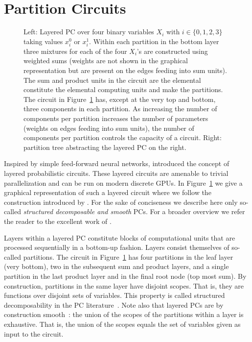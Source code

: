 \section{Partition Circuits}
\label{sec:pc}

\begin{figure}[t]

	\centering
	

	\caption{Left: Layered PC over four binary variables $X_i$ with $i \in \{0,1,2,3\}$ taking values $x_i^0$ or $x_i^1$.
		Within each partition in the bottom layer three mixtures for each of the four $X_i$'s are constructed using weighted sums (weights are not shown in the graphical representation but are present on the edges feeding into sum units).
		The sum and product units in the circuit are the elemental constitute the elemental computing units and make the partitions.
		The circuit in Figure~\ref{fig:circuit} has, except at the very top and bottom, three components in each partition.
		As increasing the number of components per partition increases the number of parameters (weights on edges feeding into sum units), the number of components per partition controls the capacity of a circuit.
		Right: partition tree abstracting the layered PC on the right.}
	\label{fig:circuit}
\end{figure}







Inspired by simple feed-forward neural networks, \citet{peharz2019random,peharz2020einsum} introduced the concept of layered probabilistic circuits.
These layered circuits are amenable to trivial parallelization and can be run on modern discrete GPUs. In Figure~\ref{fig:circuit} we give a graphical representation of such a layered circuit where we follow the construction introduced by \citet{shih2021hyperspns}. For the sake of conciseness we describe here only so-called \textit{structured decomposable and smooth} PCs. For a broader overview we refer the reader to the excellent work of \citet{vergari2021compositional}.

Layers within a layered PC constitute blocks of computational units that are processed sequentially in a bottom-up fashion. Layers consist themselves of so-called partitions. The circuit in Figure~\ref{fig:circuit} has four partitions in the leaf layer (very bottom), two in the subsequent sum and product layers, and a single partition in the last product layer and in the final root node (top most sum). By construction, partitions in the same layer have disjoint scopes. That is, they are functions over disjoint sets of variables. This property is called structured decomposability in the PC literature~\citep{darwiche2011sdd}. Note also that layered PCs are by construction smooth~\citep{darwiche2001tractable}: the union of the scopes of the partitions within a layer is exhaustive. That is, the union of the scopes equals the set of variables given as input to the circuit.

